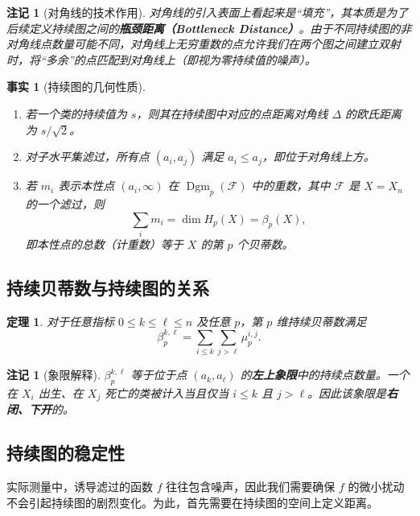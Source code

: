 \documentclass[UTF8]{ctexart}
\newtheorem{remark}[definition]{注记}
\newtheorem{fact}[definition]{事实}
\newtheorem{theorem}[definition]{定理}
\begin{document}
\begin{remark}[对角线的技术作用]
对角线的引入表面上看起来是“填充”，其本质是为了后续定义持续图之间的\textbf{瓶颈距离（Bottleneck Distance）}。由于不同持续图的非对角线点数量可能不同，对角线上无穷重数的点允许我们在两个图之间建立双射时，将“多余”的点匹配到对角线上（即视为零持续值的噪声）。
\end{remark}

\begin{fact}[持续图的几何性质]
\label{fact:pd-geometric}
\begin{enumerate}
    \item 若一个类的持续值为 \(s\)，则其在持续图中对应的点距离对角线 \(\Delta\) 的欧氏距离为 \(s/\sqrt{2}\)。
    \item 对子水平集滤过，所有点 \((a_i, a_j)\) 满足 \(a_i \le a_j\)，即位于对角线上方。
    \item 若 \(m_i\) 表示本性点 \((a_i, \infty)\) 在 \(\operatorname{Dgm}_p(\mathcal{F})\) 中的重数，其中 \(\mathcal{F}\) 是 \(X = X_n\) 的一个滤过，则
    \[
    \sum_i m_i = \dim H_p(X) = \beta_p(X),
    \]
    即本性点的总数（计重数）等于 \(X\) 的第 \(p\) 个贝蒂数。
\end{enumerate}
\end{fact}

\subsection{持续贝蒂数与持续图的关系}
\label{subsec:pd-betti-relation}

\begin{theorem}
\label{thm:pd-betti}
对于任意指标 \(0 \le k \le \ell \le n\) 及任意 \(p\)，第 \(p\) 维持续贝蒂数满足
\[
\beta_p^{k,\ell} = \sum_{i \le k} \sum_{j > \ell} \mu_p^{i,j}.
\]
\end{theorem}

\begin{remark}[象限解释]
\(\beta_p^{k,\ell}\) 等于位于点 \((a_k, a_\ell)\) 的\textbf{左上象限}中的持续点数量。一个在 \(X_i\) 出生、在 \(X_j\) 死亡的类被计入当且仅当 \(i \le k\) 且 \(j > \ell\)。因此该象限是\textbf{右闭、下开}的。
\end{remark}

\subsection{持续图的稳定性}
\label{subsec:stability}

实际测量中，诱导滤过的函数 \(f\) 往往包含噪声，因此我们需要确保 \(f\) 的微小扰动不会引起持续图的剧烈变化。为此，首先需要在持续图的空间上定义距离。
\end{document}
